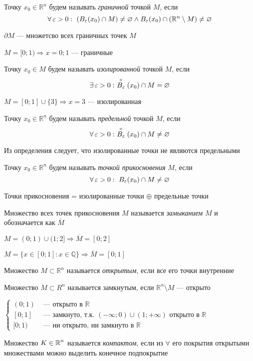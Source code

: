\documentclass[a4paper, 10pt]{article}
\begin{document}
 Точку $x_0\in\mathbb{R}^n$ будем называть \textit{граничной} точкой $M$, если $$\forall \ve>0:\ \left(B_{\ve}(x_0)\cap M\right)\ne\varnothing\wedge B_{\ve}(x_0)\cap(\mathbb{R}^n\setminus M)\ne\varnothing$$ 

\mark $\partial M$ — множетсво всех граничных точек $M$

\ex $M=[0;1)\Longrightarrow x=0;1$ — граничные

 Точку $x_0\in M$ будем называть \textit{изолированной} точкой $M$, если $$\exists \ve>0:\ \stackrel{\circ}{B_{\ve}}(x_0)\cap M=\varnothing$$ 

\ex $M=[0;1]\cup \{3\}\Longrightarrow x=3$ — изолированная

 Точку $x_0\in\mathbb{R}^n$ будем называть \textit{предельной} точкой $M$, если $$\forall \ve>0:\ \stackrel{\circ}{B_{\ve}}(x_0)\cap M\ne\varnothing$$ 

\comment Из определения следует, что изолированные точки не являются предельными

 Точку $x_0\in\mathbb{R}^n$ будем называть \textit{точкой прикосновения} $M$, если $$\forall \operatorname{\varepsilon}>0:\ B_{\operatorname{\varepsilon}}(x_0)\cap M\ne\varnothing$$ 

\comment Точки прикосновения = изолированные точки $\oplus$ предельные точки

 Множество всех точек прикосновения $M$ называется \textit{замыканием} $M$ и обозначается как $\overline {M}$

\ex $M=(0;1)\cup(1;2]\Longrightarrow\overline{M}=[0;2]$

\ex $M=\{x\in[0;1]\colon x\in \mathbb{Q}\}\Longrightarrow\overline{M}=[0;1]$

 Множество $M\subset\mathbb{R}^n$ называется \textit{открытым}, если все его точки внутренние

 Множество $M\subset R^n$ называется замкнутым, если $\mathbb{R}^n\setminus M$ — открыто

\ex $\begin{cases}
    (0;1)&\text{ — открыто в $\mathbb{R}$}\\
    [0;1]&\text{ — замкнуто, т.к. $(-\infty;0)\cup(1;+\infty)$ открыто в $\mathbb{R}$}\\
    [0;1)&\text{ — ни открыто, ни замкнуто в $\mathbb{R}$}
\end{cases}$

 Множество $K\in\operatorname{\mathbb{R}}^n$ называется \textit{компактом}, если из $\forall$ его покрытия открытыми множествами можно выделить конечное подпокрытие
\end{document}
